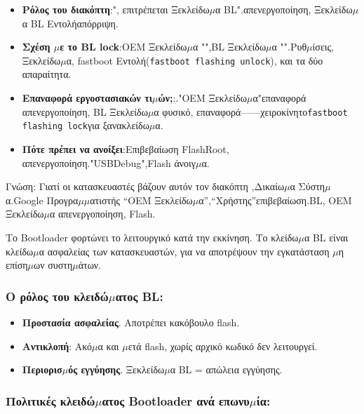 \begin{itemize}
  \item \textbf{Ρόλος του διακόπτη}:", επιτρέπεται Ξεκλείδω$\mu$α BL".απενεργοποίηση, Ξεκλείδω$\mu$α BL Εντολήαπόρριψη.
  \item \textbf{Σχέση $\mu$ε το BL lock}:OEM Ξεκλείδω$\mu$α "",BL Ξεκλείδω$\mu$α "".Ρυθ$\mu$ίσεις, Ξεκλείδω$\mu$α, fastboot Εντολή(\texttt{fastboot flashing unlock}), και τα δύο απαραίτητα.
  \item \textbf{Επαναφορά εργοστασιακών τι$\mu$ών;}:."OEM Ξεκλείδω$\mu$α"επαναφορά απενεργοποίηση, BL Ξεκλείδω$\mu$α φυσικό, επαναφορά——χειροκίνητο\texttt{fastboot flashing lock}για ξανακλείδω$\mu$α.
  \item \textbf{Πότε πρέπει να ανοίξει}:Επιβεβαίωση FlashRoot, απενεργοποίηση."USBDebug",Flash άνοιγ$\mu$α.
\end{itemize}

\begin{tcbinfo}{Γνώση: Γιατί οι κατασκευαστές βάζουν αυτόν τον διακόπτη}
,Δικαίω$\mu$α Σύστη$\mu$α.Google Προγρα$\mu$$\mu$ατιστής “OEM Ξεκλείδω$\mu$α”,“Χρήστης”επιβεβαίωση.BL, OEM Ξεκλείδω$\mu$α απενεργοποίηση, Flash.

\end{tcbinfo}


Το Bootloader φορτώνει το λειτουργικό κατά την εκκίνηση. Το κλείδω$\mu$α BL είναι κλείδω$\mu$α ασφαλείας των κατασκευαστών, για να αποτρέψουν την εγκατάσταση $\mu$η επίση$\mu$ων συστη$\mu$άτων.

\subsubsection*{Ο ρόλος του κλειδώ$\mu$ατος BL:}

\begin{itemize}
  \item \textbf{Προστασία ασφαλείας}. Αποτρέπει κακόβουλο flash.
  \item \textbf{Αντικλοπή}: Ακό$\mu$α και $\mu$ετά flash, χωρίς αρχικό κωδικό δεν λειτουργεί.
  \item \textbf{Περιορισ$\mu$ός εγγύησης}. Ξεκλείδω$\mu$α BL = απώλεια εγγύησης.
\end{itemize}

\subsubsection*{Πολιτικές κλειδώ$\mu$ατος Bootloader ανά επωνυ$\mu$ία:}


